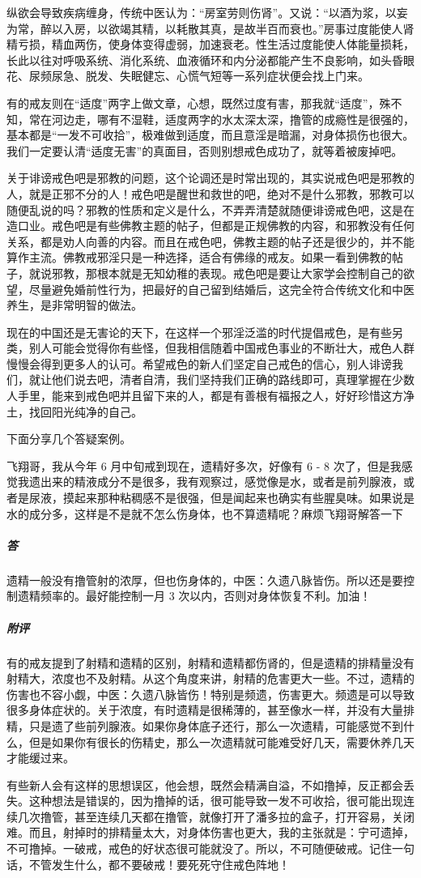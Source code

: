 纵欲会导致疾病缠身，传统中医认为：“房室劳则伤肾”。又说：“以酒为浆，以妄为常，醉以入房，以欲竭其精，以耗散其真，是故半百而衰也。”房事过度能使人肾精亏损，精血两伤，使身体变得虚弱，加速衰老。性生活过度能使人体能量损耗，长此以往对呼吸系统、消化系统、血液循环和内分泌都能产生不良影响，如头昏眼花、尿频尿急、脱发、失眠健忘、心慌气短等一系列症状便会找上门来。

有的戒友则在“适度”两字上做文章，心想，既然过度有害，那我就“适度”，殊不知，常在河边走，哪有不湿鞋，适度两字的水太深太深，撸管的成瘾性是很强的，基本都是“一发不可收拾”，极难做到适度，而且意淫是暗漏，对身体损伤也很大。我们一定要认清“适度无害”的真面目，否则别想戒色成功了，就等着被废掉吧。

关于诽谤戒色吧是邪教的问题，这个论调还是时常出现的，其实说戒色吧是邪教的人，就是正邪不分的人！戒色吧是醒世和救世的吧，绝对不是什么邪教，邪教可以随便乱说的吗？邪教的性质和定义是什么，不弄弄清楚就随便诽谤戒色吧，这是在造口业。戒色吧是有些佛教主题的帖子，但都是正规佛教的内容，和邪教没有任何关系，都是劝人向善的内容。而且在戒色吧，佛教主题的帖子还是很少的，并不能算作主流。佛教戒邪淫只是一种选择，适合有佛缘的戒友。如果一看到佛教的帖子，就说邪教，那根本就是无知幼稚的表现。戒色吧是要让大家学会控制自己的欲望，尽量避免婚前性行为，把最好的自己留到结婚后，这完全符合传统文化和中医养生，是非常明智的做法。

现在的中国还是无害论的天下，在这样一个邪淫泛滥的时代提倡戒色，是有些另类，别人可能会觉得你有些怪，但我相信随着中国戒色事业的不断壮大，戒色人群慢慢会得到更多人的认可。希望戒色的新人们坚定自己戒色的信心，别人诽谤我们，就让他们说去吧，清者自清，我们坚持我们正确的路线即可，真理掌握在少数人手里，能来到戒色吧并且留下来的人，都是有善根有福报之人，好好珍惜这方净土，找回阳光纯净的自己。

下面分享几个答疑案例。

\begin{case}
    飞翔哥，我从今年 6 月中旬戒到现在，遗精好多次，好像有 6 - 8 次了，但是我感觉我遗出来的精液成分不是很多，我有观察过，感觉像是水，或者是前列腺液，或者是尿液，摸起来那种粘稠感不是很强，但是闻起来也确实有些腥臭味。如果说是水的成分多，这样是不是就不怎么伤身体，也不算遗精呢？麻烦飞翔哥解答一下
    \subparagraph{答} 遗精一般没有撸管射的浓厚，但也伤身体的，中医：久遗八脉皆伤。所以还是要控制遗精频率的。最好能控制一月 3 次以内，否则对身体恢复不利。加油！
    \subparagraph{附评} 有的戒友提到了射精和遗精的区别，射精和遗精都伤肾的，但是遗精的排精量没有射精大，浓度也不及射精。从这个角度来讲，射精的危害更大一些。不过，遗精的伤害也不容小觑，中医：久遗八脉皆伤！特别是频遗，伤害更大。频遗是可以导致很多身体症状的。关于浓度，有时遗精是很稀薄的，甚至像水一样，并没有大量排精，只是遗了些前列腺液。如果你身体底子还行，那么一次遗精，可能感觉不到什么，但是如果你有很长的伤精史，那么一次遗精就可能难受好几天，需要休养几天才能缓过来。

    有些新人会有这样的思想误区，他会想，既然会精满自溢，不如撸掉，反正都会丢失。这种想法是错误的，因为撸掉的话，很可能导致一发不可收拾，很可能出现连续几次撸管，甚至连续几天都在撸管，就像打开了潘多拉的盒子，打开容易，关闭难。而且，射掉时的排精量太大，对身体伤害也更大，我的主张就是：宁可遗掉，不可撸掉。一破戒，戒色的好状态很可能就没了。所以，不可随便破戒。记住一句话，不管发生什么，都不要破戒！要死死守住戒色阵地！
\end{case}

